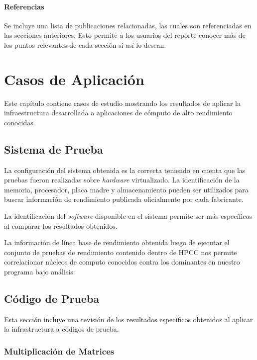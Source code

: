 \documentclass[a4paper]{report}
\begin{document}
\subsubsection{Referencias}

Se incluye una lista de publicaciones relacionadas, las cuales son referenciadas en las secciones anteriores.
Esto permite a los usuarios del reporte conocer más de los puntos relevantes de cada sección si así lo desean.

\chapter{Casos de Aplicación} \label{Casos de Aplicacion}

Este capítulo contiene casos de estudio mostrando los resultados de aplicar la infraestructura desarrollada a aplicaciones de cómputo de alto rendimiento conocidas.

\section{Sistema de Prueba}

La configuración del sistema obtenida es la correcta teniendo en cuenta que las pruebas fueron realizadas sobre {\it hardware} virtualizado. La identificación de la memoria, procesador,
placa madre y almacenamiento pueden ser utilizados para buscar información de rendimiento publicada oficialmente por cada fabricante.

\bigskip

La identificación del {\it software} disponible en el sistema permite ser más específicos al comparar los resultados obtenidos.

\bigskip

La información de línea base de rendimiento obtenida luego de ejecutar el conjunto de pruebas de rendimiento contenido dentro de HPCC nos permite correlacionar núcleos de computo
conocidos contra los dominantes en nuestro programa bajo análisis.

\section{Código de Prueba}

Esta sección incluye una revisión de los resultados específicos obtenidos al aplicar la infrastructura a códigos de prueba.

\subsection{Multiplicación de Matrices}
\end{document}

